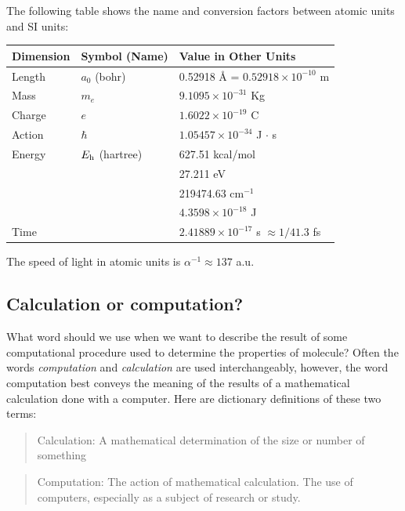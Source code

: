 \documentclass[../Main/notes.tex]{subfiles}
\begin{document}
The following table shows the name and conversion factors between atomic units and SI units:
\begin{table}[htbp]
\centering
\begin{tabular}{lll}
\toprule
Dimension & Symbol (Name) & Value in Other Units\\
\midrule
Length & $a_0$ (bohr) & 0.52918 \AA{}  = $0.52918 \times 10^{-10}$ m\\ 
Mass & $m_e$ & $9.1095 \times 10^{-31}$ Kg \\
Charge & $e$ & $1.6022 \times 10^{-19}$ C \\
Action & $\hbar$ & $1.05457 \times 10^{-34}$ J $\cdot$ s \\
Energy & $E_{\rm h}$ (hartree) & 627.51 kcal/mol \\
& & 27.211 eV \\
& & 219474.63 cm$^{-1}$ \\
& & $4.3598 \times 10^{-18}$ J\\
Time & & $2.41889 \times 10^{-17}$ s $\approx 1/41.3$ fs\\
\bottomrule
\end{tabular}
\label{tab:atomicunits}
\end{table}

The speed of light in atomic units is $\alpha^{-1}\approx 137$ a.u.

\begin{aside}
\section*{Calculation or computation?}
What word should we use when we want to describe the result of some computational procedure used to determine the properties of molecule?
Often the words \emph{computation} and \emph{calculation} are used interchangeably, however, the word computation best conveys the meaning of the results of a mathematical calculation done with a computer. Here are dictionary definitions of these two terms:
\begin{quote}
Calculation: A mathematical determination of the size or number of something
\end{quote}
\begin{quote}
Computation: The action of mathematical calculation. The use of computers, especially as a subject of research or study.
\end{quote}
\end{aside}
\end{document}

